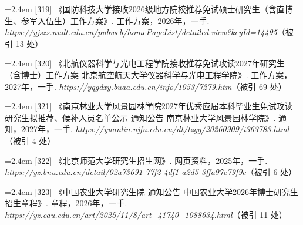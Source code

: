 {\noindent\hangindent=2.4em \label{src:S0420}{\color{cAccent}[319]} 《国防科技大学接收2026级地方院校推荐免试硕士研究生（含直博生、参军入伍生）工作方案》. 工作方案，2026年，一手. \textit{https://yjszs.nudt.edu.cn/pubweb/homePageList/detailed.view?keyId=14495}（被引 13 处）\par
\vspace{0.6pt}
\vspace{3.5pt}\par
\nopagebreak\vspace{1pt}
\noindent\hangindent=2.4em \label{src:S0421}{\color{cAccent}[320]} 《北航仪器科学与光电工程学院接收推荐免试攻读2027年研究生（含博士）工作方案-北京航空航天大学仪器科学与光电工程学院》. 工作方案，2027年，一手. \textit{https://yqgdxy.buaa.edu.cn/info/1053/7279.htm}（被引 69 处）\par
\vspace{0.6pt}
\vspace{3.5pt}\par
\nopagebreak\vspace{1pt}
\noindent\hangindent=2.4em \label{src:S0422}{\color{cAccent}[321]} 《南京林业大学风景园林学院2027年优秀应届本科毕业生免试攻读研究生拟推荐、候补人员名单公示-通知公告-南京林业大学风景园林学院》. 通知，2027年，一手. \textit{https://yuanlin.njfu.edu.cn/dt/tzgg/20260909/i363783.html}（被引 4 处）\par
\vspace{0.6pt}
\vspace{3.5pt}\par
\nopagebreak\vspace{1pt}
\noindent\hangindent=2.4em \label{src:S0423}{\color{cAccent}[322]} 《北京师范大学研究生招生网》. 网页资料，2025年，一手. \textit{https://yz.bnu.edu.cn/detail/02a73691-77f2-4df1-a2d5-3ffa97c79f9c}（被引 6 处）\par
\vspace{0.6pt}
\vspace{3.5pt}\par
\nopagebreak\vspace{1pt}
\noindent\hangindent=2.4em \label{src:S0429}{\color{cAccent}[323]} 《中国农业大学研究生院 通知公告 中国农业大学2026年博士研究生招生章程》. 章程，2026年，一手. \textit{https://yz.cau.edu.cn/art/2025/11/8/art\_41740\_1088634.html}（被引 11 处）\par
}
